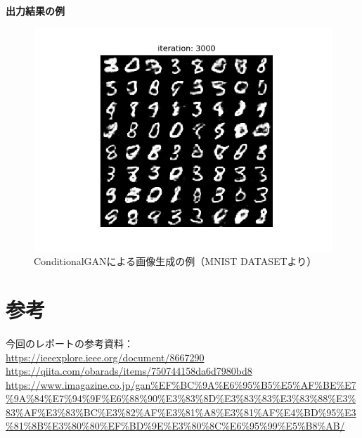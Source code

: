 \documentclass{jarticle}
\begin{document}
\textbf{出力結果の例}
\begin{figure}[h]
\centering
\includegraphics[width=12cm]{3000.jpg}
\caption{ConditionalGANによる画像生成の例（MNIST DATASETより）}
\label{GAN7}
\end{figure}

\section{参考}
今回のレポートの参考資料：\\
\url{https://ieeexplore.ieee.org/document/8667290}\\
\url{https://qiita.com/obarads/items/750744158da6d7980bd8}\\
\url{https://www.imagazine.co.jp/gan%EF%BC%9A%E6%95%B5%E5%AF%BE%E7%9A%84%E7%94%9F%E6%88%90%E3%83%8D%E3%83%83%E3%83%88%E3%83%AF%E3%83%BC%E3%82%AF%E3%81%A8%E3%81%AF%E4%BD%95%E3%81%8B%E3%80%80%EF%BD%9E%E3%80%8C%E6%95%99%E5%B8%AB/}


\end{document}
